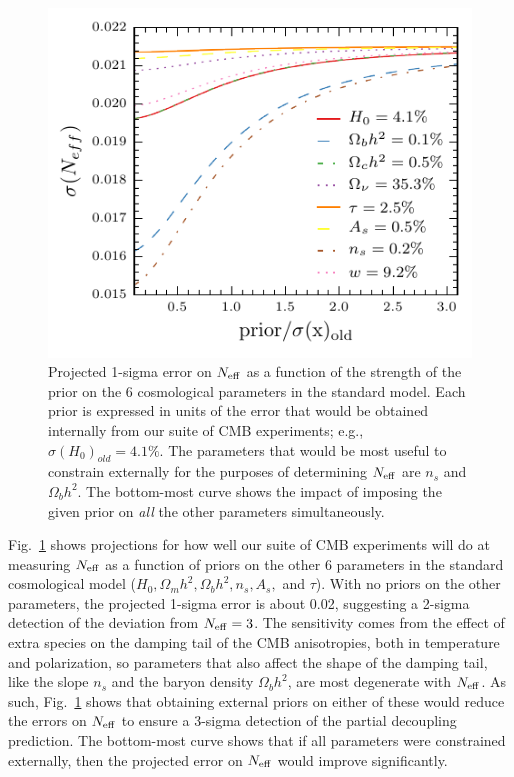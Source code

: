 \documentclass[aps,prd,reprint,superscriptaddress]{revtex4-1}
\newcommand{\reffig}[1]{Fig.~\ref{fig:#1}}
\begin{document}
\begin{figure}[htbp]
\begin{center}
\includegraphics{prior_massless_neutrinos_snow_mass.pdf}
\caption{Projected 1-sigma error on $N_{\rm eff}$ as a function of the strength of the prior on the 6 cosmological parameters in the standard model. Each prior is expressed in units of the error that would be obtained internally from our suite of CMB experiments; e.g., $\sigma(H_0)_{old}=4.1\%$. The parameters that would be most useful to constrain externally for the purposes of determining $N_{\rm eff}$ are $n_s$ and $\Omega_bh^2$. The bottom-most curve shows the impact of imposing the given prior on {\it all} the other parameters simultaneously.}
\label{fig:prior_massless_neutrinos}
\end{center}
\end{figure}

\reffig{prior_massless_neutrinos} shows projections for how well our suite of CMB experiments will do at measuring $N_{\rm eff}$ as a function of priors on the other 6 parameters in the standard cosmological model ($H_0, \Omega_mh^2,\Omega_bh^2, n_s, A_s,$ and $\tau$). With no priors on the other parameters, the projected 1-sigma error is  about 0.02, suggesting a 2-sigma detection of the deviation from $N_{\rm eff}=3$. The sensitivity comes from the effect of extra species on the damping tail of the CMB anisotropies, both in temperature and polarization, so parameters that also affect the shape of the damping tail, like the slope $n_s$ and the baryon density $\Omega_bh^2$, are most degenerate with $N_{\rm eff}$. As such, \reffig{prior_massless_neutrinos} shows that obtaining external priors on either of these would reduce the errors on $N_{\rm eff}$ to ensure a 3-sigma detection of the partial decoupling prediction. The bottom-most curve shows that if all parameters were constrained externally, then the projected error on $N_{\rm eff}$ would improve significantly.
\end{document}
